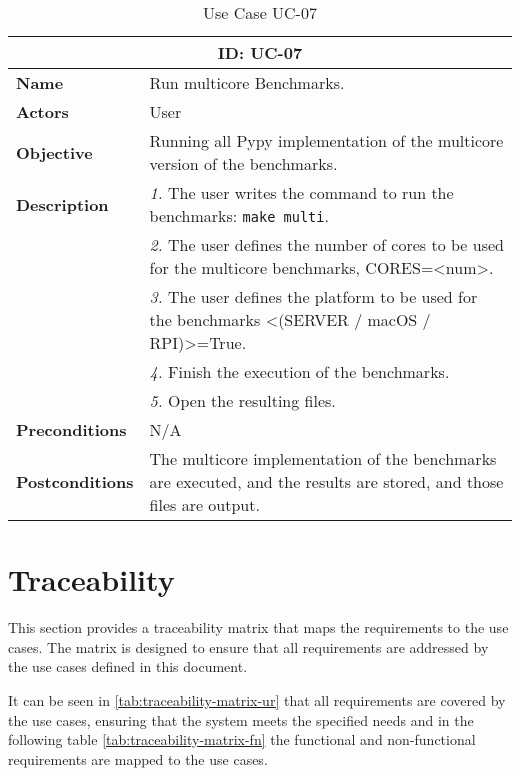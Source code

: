 \begin{table}[H]
    \centering
    \begin{tabular}{l p{10cm}}
        \toprule
        \multicolumn{2}{c}{\textbf{ID: UC-07}} \\
        \toprule
        \textbf{Name}                         &  Run multicore Benchmarks. \\
        \textbf{Actors}                       &  User \\
        \textbf{Objective}                    &  Running all Pypy implementation of the multicore version of the benchmarks. \\
        \multirow{1}{*}{\textbf{Description}} & \textsl{1.} The user writes the command to run the benchmarks: \texttt{make multi}.\\
                                              & \textsl{2.} The user defines the number of cores to be used for the multicore benchmarks, CORES=<num>.\\
                                              & \textsl{3.} The user defines the platform to be used for the benchmarks <(SERVER / macOS / RPI)>=True.\\
                                              & \textsl{4.} Finish the execution of the benchmarks.\\
                                              & \textsl{5.} Open the resulting files.\\ 
        \textbf{Preconditions}                &  N/A \\
        \textbf{Postconditions}               &  The multicore implementation of the benchmarks are executed, and the results are stored, and those files are output. \\
    \end{tabular}
    \caption{Use Case UC-07}
    \label{tab:uc-07}
\end{table}



\section{Traceability}

This section provides a traceability matrix that maps the requirements to the use cases. The matrix is designed to ensure that all requirements are addressed by the use cases defined in this document.

It can be seen in \autoref{tab:traceability-matrix-ur} that all requirements are covered by the use cases, ensuring that the system meets the specified needs and in the following table \autoref{tab:traceability-matrix-fn} the functional and non-functional requirements are mapped to the use cases.

